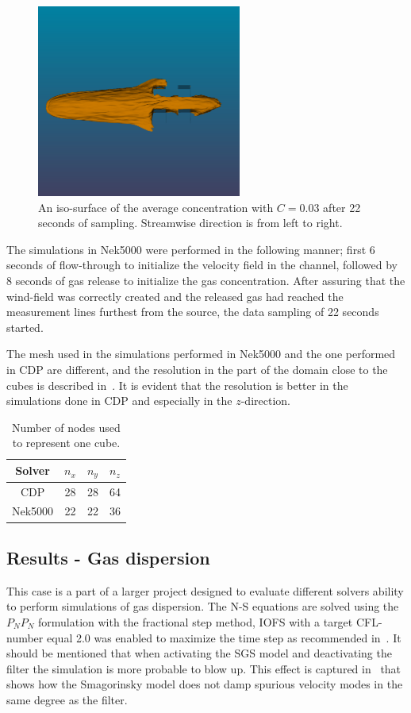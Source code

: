 %
\begin{figure}[h]
	\centering
	\includegraphics[width=0.6\textwidth]{Figures/plume2.png}
	\caption{An iso-surface of the average concentration with $C=0.03$ 
    after 22 seconds of sampling. Streamwise direction is from left to right.}
	\label{fig:plume}
\end{figure}
%
The simulations in Nek5000 were performed in the following manner; first 6 seconds of flow-through to initialize the velocity field 
in the channel, followed by 8 seconds of gas release to initialize the gas concentration. After assuring that the wind-field was 
correctly created and the released gas had reached the measurement lines furthest from the source, the data sampling of 22 seconds 
started.

The mesh used in the simulations performed in Nek5000 and the one performed in CDP are 
different, and the resolution in the part of the domain close to the cubes is described 
in~.
It is evident that the resolution is better in the simulations done in CDP and especially in 
the $z$-direction. 
\begin{table}[h]
    \centering
    \begin{tabular}{c| c c c}
        Solver   & $n_x$& $n_y$ & $n_z$ \\ \hline
        CDP      & 28 & 28 & 64 \\ 
        Nek5000  & 22 & 22 & 36 
    \end{tabular}
    \caption{Number of nodes used to represent one cube.}
    \label{tab:meshdiff}
\end{table}


\subsection{Results - Gas dispersion} 
This case is a part of a larger project designed to evaluate different solvers 
ability to perform simulations of gas dispersion. The N-S equations are solved using
the $P_NP_N$ formulation with the fractional step method, IOFS with a target CFL-number 
equal 2.0 was enabled to maximize the time step as recommended in~\cite{Nek}. It should be 
mentioned that when activating the SGS model and deactivating the 
filter the simulation is more probable to blow up. This effect is captured in~
that shows how the Smagorinsky model does not damp spurious velocity modes in the 
same degree as the filter. 

